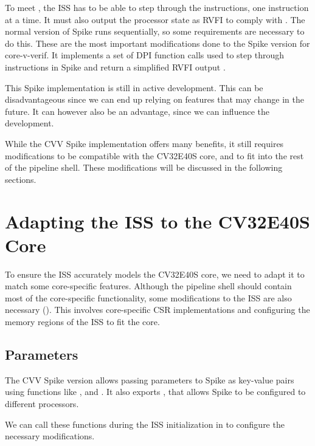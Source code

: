 To meet , the ISS has to be able to step through the instructions, one instruction at a time. It must also output the processor state as RVFI to comply with . The normal version of Spike runs sequentially, so some requirements are necessary to do this. These are the most important modifications done to the Spike version for core-v-verif. It implements a set of DPI function calls used to step through instructions in Spike and return a simplified RVFI output \cite{openhwgroupOpenhwgroupCorevverif2023}.

This Spike implementation is still in active development. This can be disadvantageous since we can end up relying on features that may change in the future. It can however also be an advantage, since we can influence the development.

While the CVV Spike implementation offers many benefits, it still requires modifications to be compatible with the CV32E40S core, and to fit into the rest of the pipeline shell. These modifications will be discussed in the following sections.

\section{Adapting the ISS to the CV32E40S Core}

To ensure the ISS accurately models the CV32E40S core, we need to adapt it to match some core-specific features. Although the pipeline shell should contain most of the core-specific functionality, some modifications to the ISS are also necessary (). This involves core-specific CSR implementations and configuring the memory regions of the ISS to fit the core.

\subsection{Parameters}

The CVV Spike version allows passing parameters to Spike as key-value pairs using functions like , and \cite{openhwgroupOpenhwgroupCorevverif2023}. It also exports , that allows Spike to be configured to different processors. 

We can call these functions during the ISS initialization in   to configure the necessary modifications. 


